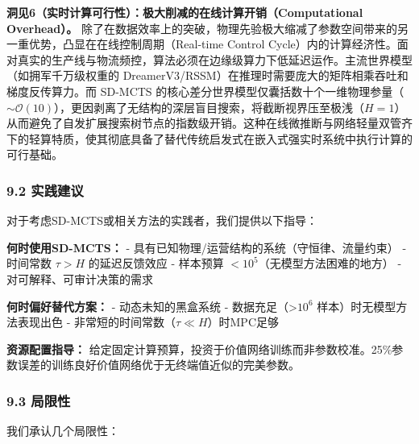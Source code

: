 \documentclass[UTF8]{ctexart}
\begin{document}
\textbf{洞见6（实时计算可行性）：极大削减的在线计算开销（Computational Overhead）。}
除了在数据效率上的突破，物理先验极大缩减了参数空间带来的另一重优势，凸显在在线控制周期（Real-time Control Cycle）内的计算经济性。面对真实的生产线与物流频控，算法必须在边缘级算力下低延迟运作。主流世界模型（如拥军千万级权重的 DreamerV3/RSSM）在推理时需要庞大的矩阵相乘吞吐和梯度反传算力。而 SD-MCTS 的核心差分世界模型仅囊括数十个一维物理参量（\(\sim \mathcal{O}(10)\)），更因剥离了无结构的深层盲目搜索，将截断视界压至极浅（\(H=1\)）从而避免了自发扩展搜索树节点的指数级开销。这种在线微推断与网络轻量双管齐下的轻算特质，使其彻底具备了替代传统启发式在嵌入式强实时系统中执行计算的可行基础。

\hypertarget{ux5b9eux8df5ux5efaux8bae}{%
\subsubsection{9.2 实践建议}\label{ux5b9eux8df5ux5efaux8bae}}

对于考虑SD-MCTS或相关方法的实践者，我们提供以下指导：

\textbf{何时使用SD-MCTS：} -
具有已知物理/运营结构的系统（守恒律、流量约束） - 时间常数 \(\tau > H\)
的延迟反馈效应 - 样本预算 \(< 10^5\)（无模型方法困难的地方） -
对可解释、可审计决策的需求

\textbf{何时偏好替代方案：} - 动态未知的黑盒系统 -
数据充足（\textgreater{}\(10^6\) 样本）时无模型方法表现出色 -
非常短的时间常数（\(\tau \ll H\)）时MPC足够

\textbf{资源配置指导：}
给定固定计算预算，投资于价值网络训练而非参数校准。25\%参数误差的训练良好价值网络优于无终端值近似的完美参数。

\hypertarget{ux5c40ux9650ux6027}{%
\subsubsection{9.3 局限性}\label{ux5c40ux9650ux6027}}

我们承认几个局限性：
\end{document}
